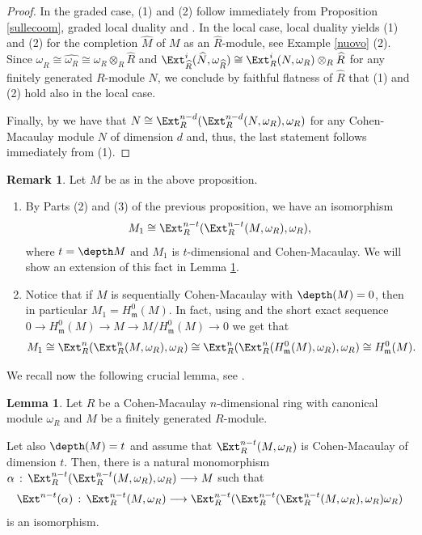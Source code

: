 \documentclass[12pt]{amsart}
\theoremstyle{definition}
\newtheorem{lemma}[theorem]{Lemma}
\theoremstyle{definition}
\newtheorem{remark}[theorem]{Remark}
\newcommand{\m}{\mathfrak{m}}
\def\frk{\mathfrak}               %
\def\mm{{\frk m}}
\let\lra\longrightarrow
\begin{document}
\begin{proof}
In the graded case,  (1) and (2) follow immediately from Proposition \ref{sullecoom}, graded local duality \cite[Theorem 3.6.19]{BH93} and \cite[Theorem 3.3.10 (c) (i)]{BH93}. In the local case, local duality yields (1) and (2) for the completion $\widehat{M}$ of $M$ as an $\widehat{R}$-module, see Example \ref{nuovo} (2). Since $\omega_{\widehat{R}} \cong \widehat{\omega_R} \cong \omega_R \otimes_R \widehat{R}$ and $\Ext^i_{\widehat{R}}(\widehat{N},\omega_{\widehat{R}}) \cong \Ext^i_R(N,\omega_R) \otimes_R \widehat{R}$ for any finitely generated $R$-module $N$, we conclude by faithful flatness of $\widehat{R}$ that (1) and (2) hold also in the local case.

Finally, by \cite[Theorem 3.3.10 (c) (iii)]{BH93} we have that $N \cong \Ext_R^{n-d}(\Ext_R^{n-d}(N,\omega_R),\omega_R)$ for any Cohen-Macaulay module $N$ of dimension $d$ and, thus,  the last statement follows immediately from  (1).
\end{proof}

\begin{remark}\label{MmoduloM_1} Let $M$ be as in the above proposition.
  \begin{enumerate}[(1)]
\item    By Parts (2) and (3) of the previous proposition, we have an isomorphism $$M_1\cong\Ext_R^{n-t}(\Ext_R^{n-t}(M,\omega_R),\omega_R),$$ where $t=\depth M$ and $M_1$ is $t$-dimensional and Cohen-Macaulay. We will show an extension of this fact in Lemma \ref{monomorphism}.

\item Notice that if $M$ is sequentially Cohen-Macaulay with  $\depth(M)=0$, then in particular $M_1= H^0_\mm(M)$. In fact, using \cite[Theorem 3.3.10 (c) (iii)]{BH93} and the short exact sequence $0 \lra H^0_\m(M) \lra M \lra M/H^0_\m(M) \lra 0$ we get that
\[
M_1 \cong \Ext_R^n(\Ext_R^n(M,\omega_R),\omega_R) \cong \Ext_R^n(\Ext_R^n(H^0_\m(M),\omega_R),\omega_R) \cong H^0_\mm(M).
\]
  \end{enumerate}
\end{remark}


We  recall now  the following crucial lemma, see \cite[Lemma 1.5]{HS01}.

\begin{lemma}\label{monomorphism}
  Let $R$ be a Cohen-Macaulay $n$-dimensional ring with canonical module $\omega_R$ and $M$ be a finitely generated $R$-module.

  Let also $\depth(M)=t$ and assume that $\Ext_R^{n-t}(M,\omega_R)$ is Cohen-Macaulay of dimension $t$. Then, there is a natural monomorphism $\alpha\,:\,\Ext_R^{n-t}(\Ext_R^{n-t}(M,\omega_R),\omega_R)\lra M$ such that 
 $$\Ext^{n-t}(\alpha)\,:\, \Ext_R^{n-t}(M,\omega_R)\lra \Ext_R^{n-t}(\Ext_R^{n-t}(\Ext_R^{n-t}(M,\omega_R),\omega_R)\omega_R)$$ is an isomorphism.
 \end{lemma}
 
\end{document}
